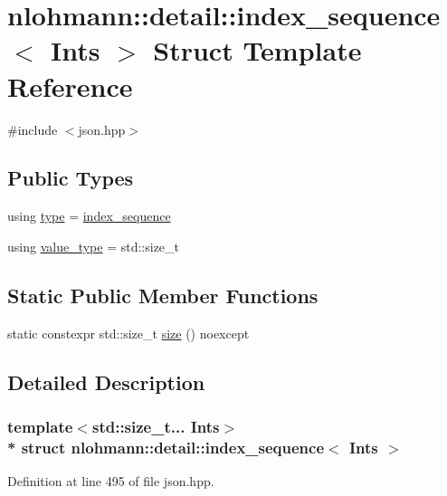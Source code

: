 \hypertarget{structnlohmann_1_1detail_1_1index__sequence}{}\section{nlohmann\+:\+:detail\+:\+:index\+\_\+sequence$<$ Ints $>$ Struct Template Reference}
\label{structnlohmann_1_1detail_1_1index__sequence}


{\ttfamily \#include $<$json.\+hpp$>$}

\subsection*{Public Types}
\begin{DoxyCompactItemize}
\item 
using \hyperlink{structnlohmann_1_1detail_1_1index__sequence_a3c14c4ab277de72b166806193ff4fa10}{type} = \hyperlink{structnlohmann_1_1detail_1_1index__sequence}{index\+\_\+sequence}
\item 
using \hyperlink{structnlohmann_1_1detail_1_1index__sequence_a2eca43d08fc1eb68bd5fa75b6714d21d}{value\+\_\+type} = std\+::size\+\_\+t
\end{DoxyCompactItemize}
\subsection*{Static Public Member Functions}
\begin{DoxyCompactItemize}
\item 
static constexpr std\+::size\+\_\+t \hyperlink{structnlohmann_1_1detail_1_1index__sequence_a7ac529419787d775f52408135304b337}{size} () noexcept
\end{DoxyCompactItemize}


\subsection{Detailed Description}
\subsubsection*{template$<$std\+::size\+\_\+t... Ints$>$\\*
struct nlohmann\+::detail\+::index\+\_\+sequence$<$ Ints $>$}



Definition at line 495 of file json.\+hpp.




